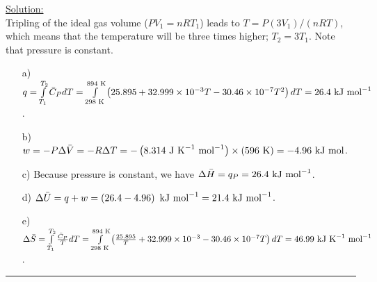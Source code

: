\noindent
\underline{Solution:}\\

Tripling of the ideal gas volume ($PV_1 = nRT_1$) leads to $T = P(3V_1) / (nRT)$, which means that the temperature will be three times higher; $T_2 = 3T_1$. Note that pressure is constant.

\begin{itemize}
\item[a)] $q = \int\limits_{T_1}^{T_2}\bar{C}_PdT = \int\limits_{298\textnormal{ K}}^{894\textnormal{ K}}\left(25.895 + 32.999\times 10^{-3}T - 30.46\times 10^{-7}T^2\right)dT = 26.4\textnormal{ kJ mol}^{-1}$.

\item[b)] $w = -P\Delta\bar{V} = -R\Delta T = -\left(8.314\textnormal{ J K}^{-1}\textnormal{ mol}^{-1}\right)\times\left(596\textnormal{ K}\right) = -4.96\textnormal{ kJ mol}$.

\item[c)] Because pressure is constant, we have $\Delta\bar{H} = q_P = 26.4\textnormal{ kJ mol}^{-1}$.

\item[d)] $\Delta\bar{U} = q + w = \left(26.4 - 4.96\right)\textnormal{ kJ mol}^{-1} = 21.4\textnormal{ kJ mol}^{-1}$.

\item[e)] $\Delta\bar{S} = \int\limits_{T_1}^{T_2}\frac{\bar{C}_P}{T}dT = \int\limits_{298\textnormal{ K}}^{894\textnormal{ K}}\left(\frac{25.895}{T} + 32.999\times 10^{-3} - 30.46\times 10^{-7}T\right)dT = 46.99\textnormal{ kJ K}^{-1}\textnormal{ mol}^{-1}$.

\end{itemize}

\hrule\vspace{0.5cm}
